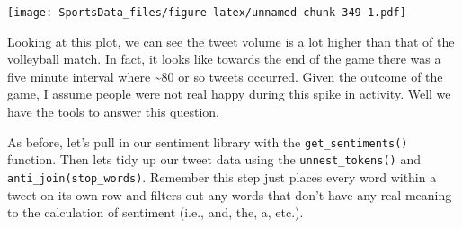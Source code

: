 \documentclass[
]{book}
\newenvironment{Shaded}{\begin{snugshade}}{\end{snugshade}}
\newcommand{\DataTypeTok}[1]{\textcolor[rgb]{0.13,0.29,0.53}{#1}}
\newcommand{\KeywordTok}[1]{\textcolor[rgb]{0.13,0.29,0.53}{\textbf{#1}}}
\newcommand{\NormalTok}[1]{#1}
\newcommand{\OperatorTok}[1]{\textcolor[rgb]{0.81,0.36,0.00}{\textbf{#1}}}
\newcommand{\StringTok}[1]{\textcolor[rgb]{0.31,0.60,0.02}{#1}}
\begin{document}
\begin{Shaded}
\end{Shaded}

\texttt{[image: SportsData\_files/figure-latex/unnamed-chunk-349-1.pdf]}

Looking at this plot, we can see the tweet volume is a lot higher than that of the volleyball match. In fact, it looks like towards the end of the game there was a five minute interval where \textasciitilde80 or so tweets occurred. Given the outcome of the game, I assume people were not real happy during this spike in activity. Well we have the tools to answer this question.

As before, let's pull in our sentiment library with the \texttt{get\_sentiments()} function. Then lets tidy up our tweet data using the \texttt{unnest\_tokens()} and \texttt{anti\_join(stop\_words)}. Remember this step just places every word within a tweet on its own row and filters out any words that don't have any real meaning to the calculation of sentiment (i.e., and, the, a, etc.).

\begin{Shaded}
\end{Shaded}
\end{document}
